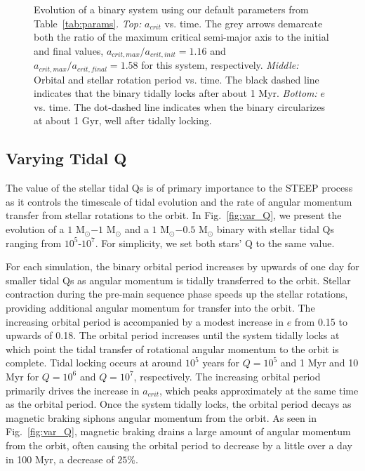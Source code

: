 \begin{figure}
   \caption{Evolution of a binary system using our default parameters from Table~\ref{tab:params}.  {\it Top:} $a_{crit}$ vs. time.  The grey arrows demarcate both the ratio of the maximum critical semi-major axis to the initial and final values, $a_{crit,max}/a_{crit,init} = 1.16$ and $a_{crit,max}/a_{crit,final} = 1.58$ for this system, respectively. {\it Middle:} Orbital and stellar rotation period vs. time.  The black dashed line indicates that the binary tidally locks after about 1 Myr.  {\it Bottom:} $e$ vs. time.  The dot-dashed line indicates when the binary circularizes at about 1 Gyr, well after tidally locking.}
    \label{fig:example}
\end{figure}

\subsection{Varying Tidal Q} \label{sec:var_Q}

The value of the stellar tidal Qs is of primary importance to the STEEP process as it controls the timescale of tidal evolution and the rate of angular momentum transfer from stellar rotations to the orbit.  In Fig.~\ref{fig:var_Q}, we present the evolution of a $1$ M$_{\odot}$$-1$ M$_{\odot}$ and a $1$ M$_{\odot}$$-0.5$ M$_{\odot}$ binary with stellar tidal Qs ranging from $10^5$-$10^7$.  For simplicity, we set both stars' Q to the same value.  

For each simulation, the binary orbital period increases by upwards of one day for smaller tidal Qs as angular momentum is tidally transferred to the orbit.  Stellar contraction during the pre-main sequence phase speeds up the stellar rotations, providing additional angular momentum for transfer into the orbit.  The increasing orbital period is accompanied by a modest increase in $e$ from 0.15 to upwards of 0.18.  The orbital period increases until the system tidally locks at which point the tidal transfer of rotational angular momentum to the orbit is complete.  Tidal locking occurs at around $10^5$ years for $Q=10^5$ and 1 Myr and 10 Myr for $Q=10^6$ and $Q=10^7$, respectively.  The increasing orbital period primarily drives the increase in $a_{crit}$, which peaks approximately at the same time as the orbital period.  Once the system tidally locks, the orbital period decays as magnetic braking siphons angular momentum from the orbit.  As seen in Fig.~\ref{fig:var_Q}, magnetic braking drains a large amount of angular momentum from the orbit, often causing the orbital period to decrease by a little over a day in 100 Myr, a decrease of $25\%$.

